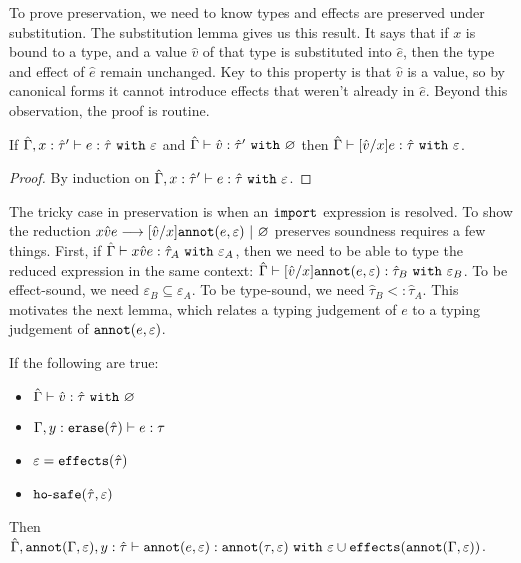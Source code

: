 \noindent
To prove preservation, we need to know types and effects are preserved under substitution. The substitution lemma gives us this result. It says that if $x$ is bound to a type, and a value $\hat v$ of that type is substituted into $\hat e$, then the type and effect of $\hat e$ remain unchanged. Key to this property is that $\hat v$ is a value, so by canonical forms it cannot introduce effects that weren't already in $\hat e$. Beyond this observation, the proof is routine.

\begin{lemma}[Substitution]
If $\hat \Gamma, x: \hat \tau' \vdash e: \hat \tau~\mathtt{with}~ \varepsilon$ and $\hat \Gamma \vdash \hat v: \hat \tau'~\mathtt{with}~ \varnothing$ then $\hat \Gamma \vdash [\hat v/x]e: \hat \tau~\mathtt{with}~ \varepsilon$.
\end{lemma}

\begin{proof} By induction on $\hat \Gamma, x: \hat \tau' \vdash e: \hat \tau~\mathtt{with}~ \varepsilon$.
\end{proof}

\noindent
The tricky case in preservation is when an $\mathtt{import}$ expression is resolved. To show the reduction ${x}{\hat v}{e} \longrightarrow [\hat v/x]\mathtt{annot}(e, \varepsilon)~|~\varnothing$ preserves soundness requires a few things. First, if $\hat \Gamma \vdash {x}{\hat v}{e}: \hat \tau_A~\mathtt{with}~ \varepsilon_A$, then we need to be able to type the reduced expression in the same context: $\hat \Gamma \vdash [\hat v/x]\mathtt{annot}(e, \varepsilon): \hat \tau_B~\mathtt{with}~ \varepsilon_B$. To be effect-sound, we need $\varepsilon_B \subseteq \varepsilon_A$. To be type-sound, we need $\hat \tau_B <: \hat \tau_A$. This motivates the next lemma, which relates a typing judgement of $e$ to a typing judgement of $\mathtt{annot}(e, \varepsilon)$.

\begin{lemma}[Annotation]
If the following are true:

\begin{itemize}
	\setlength\itemsep{-0.7em}
	\item $\hat \Gamma \vdash \hat v : \hat \tau~\mathtt{with}~ \varnothing$
	\item $\Gamma, y: \mathtt{erase}(\hat \tau) \vdash e: \tau$
	\item $\varepsilon = \mathtt{effects}(\hat \tau)$
	\item $\mathtt{ho \hbox{-} safe}(\hat \tau, \varepsilon)$
\end{itemize}

\noindent
Then $\hat \Gamma, \mathtt{annot}(\Gamma, \varepsilon), y: \hat \tau \vdash \mathtt{annot}(e, \varepsilon) : \mathtt{annot}(\tau, \varepsilon)~\mathtt{with}~ \varepsilon \cup \mathtt{effects}(\mathtt{annot}(\Gamma, \varepsilon))$.
\end{lemma}

